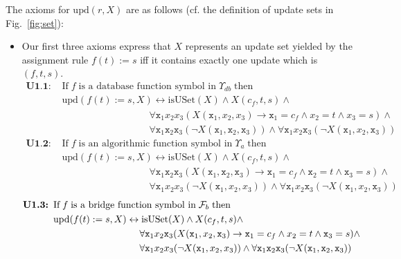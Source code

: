 \documentclass[preprint,11pt]{elsarticle}
\theoremstyle{definition}
\theoremstyle{remark}
\begin{document}
The axioms for $\mathrm{upd}(r,X)$ are as follows (cf. the definition of update sets in Fig.~\ref{fig:set}):
\begin{itemize}
\item Our first three axioms express that $X$ represents an update set yielded by the assignment rule $f(t) := s$ iff it contains exactly one update which is $(f,t,s)$. 
\begin{align*}
\textbf{U1.1: } & \text{If} \; f \; \text{is a database function symbol in} \; \Upsilon_{db} \; \text{then}&\\  
&\mathrm{upd}(f(t) := s, X) \leftrightarrow \mathrm{isUSet}(X) \wedge X(c_f, t, s) \wedge&\\
&\qquad \qquad \qquad \qquad \quad \forall \mathtt{x}_1 x_2 x_3 (X(\mathtt{x}_1,x_2,x_3) \rightarrow \mathtt{x}_1 = c_f \wedge x_2 = t \wedge x_3 = s) \wedge&\\
&\qquad \qquad \qquad \qquad \quad \forall \mathtt{x}_1 \mathtt{x}_2 \mathtt{x}_3 (\neg X(\mathtt{x}_1,\mathtt{x}_2,\mathtt{x}_3)) \wedge \forall \mathtt{x}_1 x_2 \mathtt{x}_3 (\neg X(\mathtt{x}_1,x_2,\mathtt{x}_3)) 
\end{align*}
\begin{align*}
\textbf{U1.2: } & \text{If} \; f \; \text{is an algorithmic function symbol in} \; \Upsilon_{a} \; \text{then}&\\  
&\mathrm{upd}(f(t) := s, X) \leftrightarrow \mathrm{isUSet}(X) \wedge X(c_f, t, s) \wedge &\\
&\qquad \qquad \qquad \qquad \quad \forall \mathtt{x}_1 \mathtt{x}_2 \mathtt{x}_3 (X(\mathtt{x}_1,\mathtt{x}_2,\mathtt{x}_3) \rightarrow \mathtt{x}_1 = c_f \wedge \mathtt{x}_2 = t \wedge \mathtt{x}_3 = s) \wedge&\\
&\qquad \qquad \qquad \qquad \quad \forall \mathtt{x}_1 x_2 x_3 (\neg X(\mathtt{x}_1,x_2,x_3)) \wedge \forall \mathtt{x}_1 x_2 \mathtt{x}_3 (\neg X(\mathtt{x}_1,x_2,\mathtt{x}_3)) 
\end{align*}
\begin{align*}
\textbf{U1.3: } & \text{If} \; f \; \text{is a bridge function symbol in} \; {\cal F}_b \; \text{then}&\\  
&\mathrm{upd}(f(t) := s, X) \leftrightarrow \mathrm{isUSet}(X) \wedge X(c_f, t, s) \wedge &\\
&\qquad \qquad \qquad \qquad \quad \forall \mathtt{x}_1 x_2 \mathtt{x}_3 (X(\mathtt{x}_1,x_2,\mathtt{x}_3) \rightarrow \mathtt{x}_1 = c_f \wedge x_2 = t \wedge \mathtt{x}_3 = s) \wedge&\\
&\qquad \qquad \qquad \qquad \quad \forall \mathtt{x}_1 x_2 x_3 (\neg X(\mathtt{x}_1,x_2,x_3)) \wedge \forall \mathtt{x}_1 \mathtt{x}_2 \mathtt{x}_3 (\neg X(\mathtt{x}_1,\mathtt{x}_2,\mathtt{x}_3))& 

\end{align*}
\end{itemize}
\end{document}

